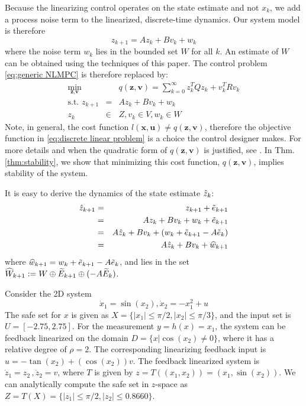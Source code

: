 Because the linearizing control operates on the state estimate and not $x_k$, we add a process noise term to the linearized, discrete-time dynamics. 
Our system model is therefore
\begin{equation}
\label{eq:discrete linear dyn}
z_{k+1} = Az_k + Bv_k + w_k
\end{equation}
where the noise term $w_k$ lies in the bounded set $W$ for all $k$.
An estimate of $W$ can be obtained using the techniques of this paper.
The control problem \eqref{eq:generic NLMPC} is therefore replaced by:
\begin{eqnarray}
\label{eq:discrete linear problem}
\min_{\textbf{z},\textbf{v}} &\;& q(\mathbf{z},\mathbf{v}) = \sum_{k=0}^{\infty}z_k^TQz_k + v_k^TRv_k \\
\text{s.t. } z_{k+1} &=& Az_k + Bv_k + w_k\nonumber \\
z_k&\in& Z,  v_k \in V,w_k \in W  \nonumber
\end{eqnarray}
Note, in general, the cost function $l(\mathbf{x},\mathbf{u}) \neq q(\mathbf{z},\mathbf{v})$, therefore the  objective function in \eqref{eq:discrete linear problem} is a choice the control designer makes. For more details and when the quadratic form of $q(\mathbf{z},\mathbf{v})$ is justified, see \cite{SimonLG13_MPC}.
In Thm. \ref{thm:stability}, we show that minimizing this cost function, $q(\mathbf{z},\mathbf{v})$, implies stability of the system.

It is easy to derive the dynamics of the state estimate $\hat{z}_{k}$: 
\begin{eqnarray}
\label{eq:dynamics_estimate}
\hat{z}_{k+1} &=& z_{k+1} + \tilde{e}_{k+1} \\
&=&Az_k + Bv_k + w_k + \tilde{e}_{k+1}  \nonumber\\
&=&A\hat{z}_k + Bv_k + (w_k+ \tilde{e}_{k+1} -A \tilde{e}_{k}) \nonumber\\
&=&A\hat{z}_k + Bv_k + \widehat{w}_{k+1} \nonumber
\end{eqnarray}
where $\widehat{w}_{k+1} = w_k+ \tilde{e}_{k+1} -A \tilde{e}_{k}$, and lies in the set $\widehat{W}_{k+1} := W\oplus\widetilde{E}_{k+1}\oplus(-A\widetilde{E}_k)$. 

\begin{exmp}
	Consider the 2D system 
	\begin{equation}
	\label{eq:toy_dynamics}
	\dot{x}_1 = \sin(x_2) , \dot{x}_2 =-x_1^2 + u 
	\end{equation}
	The safe set for $x$ is given as $X = \lbrace |x_1| \leq \pi /2, |x_2| \leq \pi/3 \rbrace$, and the input set is $U = [-2.75, 2.75]$.
	For the measurement $y = h(x) = x_1$, the system can be feedback linearized on the domain $D = \lbrace x | \cos(x_2) \neq 0 \rbrace $, where it has a relative degree of $\rho=2$. 
	The corresponding linearizing feedback input is $u = -\tan(x_2) + (\cos(x_2))v$.
	The feedback linearized system is $\dot{z}_1 = z_2\, ,\dot{z}_2 = v$, where $T$ is given by $z=T((x_1,x_2)) = (x_1, \sin(x_2))$.	
	We can analytically compute the safe set in $z$-space as $Z = T(X) =  \lbrace |z_1| \leq \pi /2, |z_2| \leq 0.8660\rbrace$.
	\exmend
\end{exmp}

